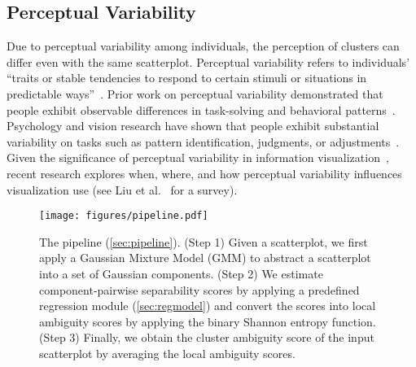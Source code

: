 \subsection{Perceptual Variability}
% 
Due to perceptual variability among individuals, the perception of clusters can differ even with the same scatterplot.  Perceptual variability refers to individuals’ ``traits or stable tendencies to respond to certain stimuli or situations in predictable ways''~\cite{dillon1996user}. Prior work on perceptual variability demonstrated that people exhibit observable differences in task-solving and behavioral patterns~\cite{woolhouse2000personality}. 
Psychology and vision research 
have shown that 
people exhibit substantial variability 
on tasks such as pattern identification, judgments, or adjustments~\cite{hoskin2019sensitivity, huang2010distortions, ons2011subjectively}. 
Given the significance of perceptual variability in information visualization~\cite{davis2022risks,ziemkiewicz2009preconceptions}, 
 recent research explores when, where, and how perceptual variability influences visualization use (see Liu et al.~\cite{liu2020survey} for a survey). 



\begin{figure*}
    \centering
    \texttt{[image: figures/pipeline.pdf]}
    \vspace{-6mm}
    \caption{The 
    \measure pipeline (\autoref{sec:pipeline}). (Step 1) Given a scatterplot, we first apply a Gaussian Mixture Model (GMM) to abstract 
    a scatterplot into a set of Gaussian components. (Step 2) We estimate component-pairwise separability scores by applying a predefined regression module (\autoref{sec:regmodel}) and convert the scores into local ambiguity scores by applying the binary Shannon entropy function. (Step 3) Finally, we obtain the cluster ambiguity score of the input scatterplot by averaging the local ambiguity scores.
    \vspace{-4mm}
    }
    \label{fig:pipeline}
\end{figure*}
%

